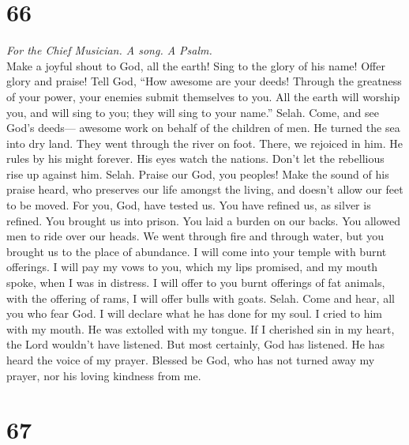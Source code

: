 \hypertarget{section-65}{%
\section{66}\label{section-65}}

\emph{For the Chief Musician. A song. A Psalm.}\\
 Make a joyful shout to God, all the earth! 
Sing to the glory of his name! Offer glory and praise! 
Tell God, ``How awesome are your deeds! Through the greatness of your
power, your enemies submit themselves to you.  All the
earth will worship you, and will sing to you; they will sing to your
name.'' Selah.  Come, and see God's deeds--- awesome work
on behalf of the children of men.  He turned the sea into
dry land. They went through the river on foot. There, we rejoiced in
him.  He rules by his might forever. His eyes watch the
nations. Don't let the rebellious rise up against him. Selah.
 Praise our God, you peoples! Make the sound of his praise
heard,  who preserves our life amongst the living, and
doesn't allow our feet to be moved.  For you, God, have
tested us. You have refined us, as silver is refined. 
You brought us into prison. You laid a burden on our backs.
 You allowed men to ride over our heads. We went through
fire and through water, but you brought us to the place of abundance.
 I will come into your temple with burnt offerings. I
will pay my vows to you,  which my lips promised, and my
mouth spoke, when I was in distress.  I will offer to you
burnt offerings of fat animals, with the offering of rams, I will offer
bulls with goats. Selah.  Come and hear, all you who fear
God. I will declare what he has done for my soul.  I
cried to him with my mouth. He was extolled with my tongue.
 If I cherished sin in my heart, the Lord wouldn't have
listened.  But most certainly, God has listened. He has
heard the voice of my prayer.  Blessed be God, who has
not turned away my prayer, nor his loving kindness from me.

\hypertarget{section-66}{%
\section{67}\label{section-66}}

